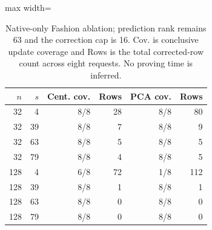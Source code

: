 \begin{table}[tbp]
\centering
\small
\caption{Native-only Fashion ablation; prediction rank remains 63 and the correction cap is 16. Cov. is conclusive update coverage and Rows is the total corrected-row count across eight requests. No proving time is inferred.}
\label{tab:ccd-ranks}
\begin{adjustbox}{max width=\columnwidth}
\begin{tabular}{rrrrrr}
\toprule
$n$ & $s$ & Cent. cov. & Rows & PCA cov. & Rows\\
\midrule
32 & 4 & 8/8 & 28 & 8/8 & 80\\
32 & 39 & 8/8 & 7 & 8/8 & 9\\
32 & 63 & 8/8 & 5 & 8/8 & 5\\
32 & 79 & 8/8 & 4 & 8/8 & 5\\
128 & 4 & 6/8 & 72 & 1/8 & 112\\
128 & 39 & 8/8 & 1 & 8/8 & 1\\
128 & 63 & 8/8 & 0 & 8/8 & 0\\
128 & 79 & 8/8 & 0 & 8/8 & 0\\
\bottomrule
\end{tabular}
\end{adjustbox}
\end{table}
